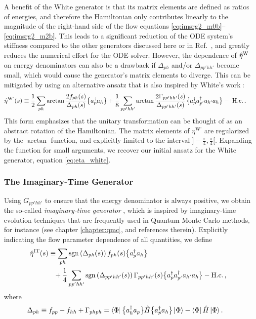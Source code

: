 {A benefit of the White generator is that its matrix elements are defined 
as ratios of energies, and therefore the Hamiltonian only contributes linearly 
to the magnitude of the right-hand side of the flow equations \eqref{eq:imsrg2_m0b}--
\eqref{eq:imsrg2_m2b}. This leads to a significant reduction of the 
ODE system's stiffness compared to the other generators discussed here or in
Ref.~\cite{Hergert:2016jk}, and greatly reduces the numerical effort for the
ODE solver. However, the dependence of $\hat{\eta}^\text{W}$ on energy denominators
can also be a drawback if $\Delta_{ph}$ and/or $\Delta_{pp'hh'}$ become
small, which would cause the generator's matrix elements to diverge. This can be
mitigated by using an alternative ansatz that is also inspired by White's work 
\cite{White:2002fk}:
\begin{align}
  \etaO^\text{W'}(s)
  &\equiv\frac{1}{2}\sum_{ph}\arctan\frac{2 f_{ph}(s)}{\Delta_{ph}(s)}\nord{\aaO_{p}\aO_{h}}
  +\frac{1}{8}\sum_{pp'hh'}\arctan\frac{2\Gamma_{pp'hh'}(s)}{\Delta_{pp'hh'}(s)}
    \nord{\aaO_{p}\aaO_{p'}\aO_{h'}\aO_{h}}-\;\text{H.c.}\label{eq:eta_whiteatan}\,.
\end{align}
This form emphasizes that the unitary transformation can be thought of as an
abstract rotation of the Hamiltonian. The matrix elements of $\eta^\text{W'}$
are regularized by the $\arctan$ function, and explicitly limited to the 
interval $]-\tfrac{\pi}{4},\tfrac{\pi}{4}[$. Expanding the function for 
small arguments, we recover our initial ansatz for the White generator, 
equation \eqref{eq:eta_white}. 

%
%
\subsubsection{\label{sec:imsrg_generator_imtime}The Imaginary-Time Generator}
Using $G_{pp'hh'}$ to ensure that the energy denominator is always
positive, we obtain the so-called \emph{imaginary-time generator}
\cite{Morris:2015ve,Hergert:2014vn,Hergert:2016jk},
which is inspired by imaginary-time evolution techniques that are 
frequently used in Quantum Monte Carlo methods, for instance (see
chapter \ref{chapter:qmc}, \cite{Carlson:2015lq} and references therein). Explicitly 
indicating the flow parameter dependence of all quantities, we
define
\begin{align}
  \etaO^\text{IT}(s)&\equiv\sum_{ph} \sgn\!\left(\Delta_{ph}(s)\right) f_{ph}(s)\nord{\aaO_{p}\aO_{h}}\notag\\
  &\hphantom{=}
   +\frac{1}{4}\sum_{pp'hh'}\sgn\!\left(\Delta_{pp'hh'}(s)\right)\Gamma_{pp'hh'}(s)
    \nord{\aaO_{p}\aaO_{p'}\aO_{h'}\aO_{h}}-\text{H.c.}\,,\label{eq:eta_imtime}
\end{align}
where
\begin{align}
  \Delta_{ph}&\equiv
    f_{pp}-f_{hh} + \Gamma_{phph} 
    =\dmatrixe{\Phi}{\nord{\aaO_{h}\aO_{p}}\HO\nord{\aaO_{p}\aO_{h}}}-\dmatrixe{\Phi}{\HO}\,.\label{eq:def_epsteinnesbet_1b}
\end{align}

}

